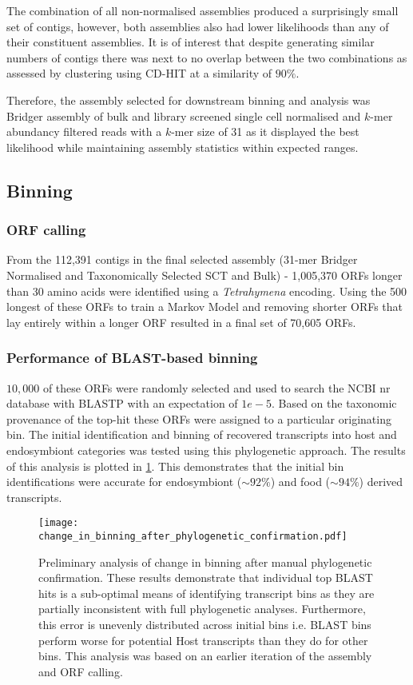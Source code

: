 The combination of all non-normalised assemblies produced a surprisingly small
set of contigs, however, both assemblies also had lower likelihoods than 
any of their constituent assemblies. It is of interest that despite 
generating similar numbers of contigs there was next to no overlap between 
the two combinations as assessed by clustering using CD-HIT at a similarity of \(90\%\).

Therefore, the assembly selected for downstream binning and analysis was Bridger 
assembly of bulk and library screened single cell normalised and \(k\)-mer
abundancy filtered reads with a \(k\)-mer size of 31 as it displayed the best likelihood
while maintaining assembly statistics within expected ranges. 


\subsection{Binning}

\subsubsection{ORF calling}

From the 112,391 contigs in the final selected assembly (31-mer Bridger
Normalised and Taxonomically Selected SCT and Bulk) - 1,005,370 ORFs
longer than 30 amino acids were identified using a \textit{Tetrahymena} encoding.
Using the 500 longest of these ORFs to train a Markov Model and removing
shorter ORFs that lay entirely within a longer ORF resulted in a final set
of 70,605 ORFs.

\subsubsection{Performance of BLAST-based binning}
\(10,000\) of these ORFs were randomly selected and used to search the NCBI
nr database with BLASTP with an expectation of \(1e-5\).  Based on the taxonomic
provenance of the top-hit these ORFs were assigned to a particular originating
bin.  
The initial identification and binning of recovered transcripts into host and endosymbiont categories was 
tested using this phylogenetic approach. The results of this analysis is plotted 
in \cref{fig:taxabins}. This demonstrates that the initial bin identifications were accurate for
endosymbiont (\(\sim92\%\)) and food (\(\sim94\%\)) derived transcripts. 

\begin{figure}[h!]
    \texttt{[image: change\_in\_binning\_after\_phylogenetic\_confirmation.pdf]}
    \caption[Preliminary transcript binning analysis]{Preliminary analysis of change in binning after manual phylogenetic confirmation.  These results demonstrate that individual top BLAST hits is a sub-optimal means of 
    identifying transcript bins as they are partially inconsistent with full phylogenetic analyses. Furthermore,
    this error is unevenly distributed across initial bins i.e. BLAST bins perform worse for potential Host transcripts
    than they do for other bins. 
    	This analysis was based on an earlier iteration of the assembly and ORF calling. }
        \label{fig:taxabins}
\end{figure}

